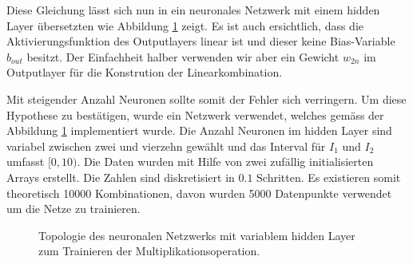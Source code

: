 Diese Gleichung lässt sich nun in ein neuronales Netzwerk mit einem hidden Layer übersetzten wie Abbildung \ref{fig:mst_variable_hidden_layer} zeigt. Es ist auch ersichtlich, dass die Aktivierungsfunktion des Outputlayers linear ist und dieser keine Bias-Variable $b_{out}$ besitzt. Der Einfachheit halber verwenden wir aber ein Gewicht $w_{2n}$ im Outputlayer für die Konstrution der Linearkombination.

Mit steigender Anzahl Neuronen sollte somit der Fehler sich verringern. Um diese Hypothese zu bestätigen, wurde ein Netzwerk verwendet, welches gemäss der Abbildung \ref{fig:mst_variable_hidden_layer} implementiert wurde. Die Anzahl Neuronen im hidden Layer sind variabel zwischen zwei und vierzehn gewählt und das Interval für $I_1$ und $I_2$ umfasst $[0, 10)$. Die Daten wurden mit Hilfe von zwei zufällig initialisierten Arrays erstellt. Die Zahlen sind diskretisiert in $0.1$ Schritten. Es existieren somit theoretisch 10000 Kombinationen, davon wurden 5000 Datenpunkte verwendet um die Netze zu trainieren.

\begin{figure}
	\centering
	\label{fig:mst_variable_hidden_layer}
	\caption{Topologie des neuronalen Netzwerks mit variablem hidden Layer zum Trainieren der Multiplikationsoperation.}
\end{figure}

